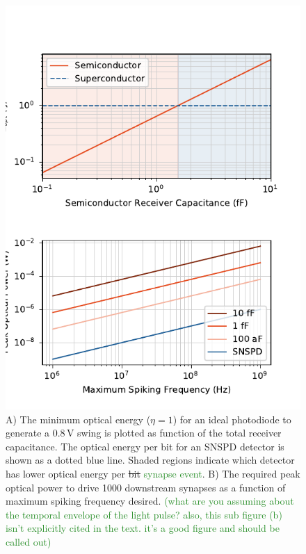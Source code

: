 \documentclass[twocolumn]{article}
\begin{document}
\begin{figure}
    \centering
    \includegraphics[scale=1]{opticalv2.pdf}
    \caption{A) The minimum optical energy ($\eta = 1$) for an ideal photodiode to generate a 0.8\,V swing is plotted as function of the total receiver capacitance. The optical energy per bit for an SNSPD detector is shown as a dotted blue line. Shaded regions indicate which detector has lower optical energy per \sout{bit} \textcolor{ForestGreen}{synapse event}. B) The required peak optical power to drive 1000 downstream synapses as a function of maximum spiking frequency desired. \textcolor{ForestGreen}{(what are you assuming about the temporal envelope of the light pulse? also, this sub figure (b) isn't explicitly cited in the text. it's a good figure and should be called out)}}
    \label{fig:communication}
\end{figure}
\end{document}
